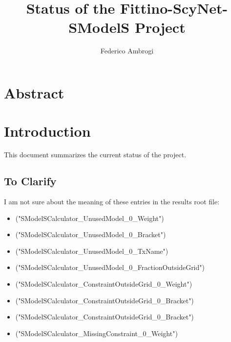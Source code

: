 \documentclass[a4paper,11pt]{article}
\begin{document}
\title{\boldmath Status of the Fittino-ScyNet-SModelS Project}

\author[a]{Federico Ambrogi}

\maketitle




\newcommand{\MG}{\texttt{MadGraph5\_aMC@NLO}}

\newcommand{\jmet}{ $3jet+E_T^{miss}$ }

\newcommand{\SMO}{ \texttt{SModelS}}
\newcommand{\FastLim}{ \texttt{FastLim}}


\section*{Abstract}


\section{Introduction}

This document summarizes the current status of the project.

\subsection{To Clarify}
I am not sure about the meaning of these entries in the results root file:
\begin{itemize}
	\item ("SModelSCalculator\_UnusedModel\_0\_Weight")
	\item ("SModelSCalculator\_UnusedModel\_0\_Bracket") 
	\item ("SModelSCalculator\_UnusedModel\_0\_TxName") 
	\item ("SModelSCalculator\_UnusedModel\_0\_FractionOutsideGrid") 
	\item ("SModelSCalculator\_ConstraintOutsideGrid\_0\_Weight") 
	\item ("SModelSCalculator\_ConstraintOutsideGrid\_0\_Bracket") 
	\item ("SModelSCalculator\_ConstraintOutsideGrid\_0\_Bracket") 
	\item ("SModelSCalculator\_MissingConstraint\_0\_Weight") 
\end{itemize}
\end{document}
